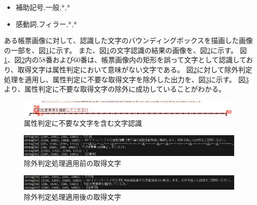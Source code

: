 \begin{itemize}
    \item 補助記号,一般,*,*
    \item 感動詞,フィラー,*,*
\end{itemize}

ある帳票画像に対して、認識した文字のバウンディングボックスを描画した画像の一部を、図\ref{fig:before_exclusion_bbox}に示す。
また、図\ref{fig:before_exclusion_bbox}の文字認識の結果の画像を、図\ref{fig:before_exclusion_string}に示す。
図\ref{fig:before_exclusion_bbox}、図\ref{fig:before_exclusion_string}内の58番および60番は、帳票画像内の矩形を誤って文字として認識しており、取得文字は属性判定において意味がない文字である。
図\ref{fig:before_exclusion_string}に対して除外判定処理を適用し、属性判定に不要な取得文字を除外した出力を、図\ref{fig:after_exclusion_string}に示す。
図\ref{fig:after_exclusion_string}より、属性判定に不要な取得文字の除外に成功していることがわかる。

\begin{figure}[t]
    \begin{center}
        \includegraphics[width=15cm]{image/04-implementation/before_exclusion_bbox.png}
        \caption{属性判定に不要な文字を含む文字認識}
        \label{fig:before_exclusion_bbox}
    \end{center}
\end{figure}

\begin{figure}[t]
    \begin{center}
        \includegraphics[width=15cm]{image/04-implementation/before_exclusion_string.png}
        \caption{除外判定処理適用前の取得文字}
        \label{fig:before_exclusion_string}
    \end{center}
\end{figure}

\begin{figure}[t]
    \begin{center}
        \includegraphics[width=15cm]{image/04-implementation/after_exclusion_string.png}
        \caption{除外判定処理適用後の取得文字}
        \label{fig:after_exclusion_string}
    \end{center}
\end{figure}


